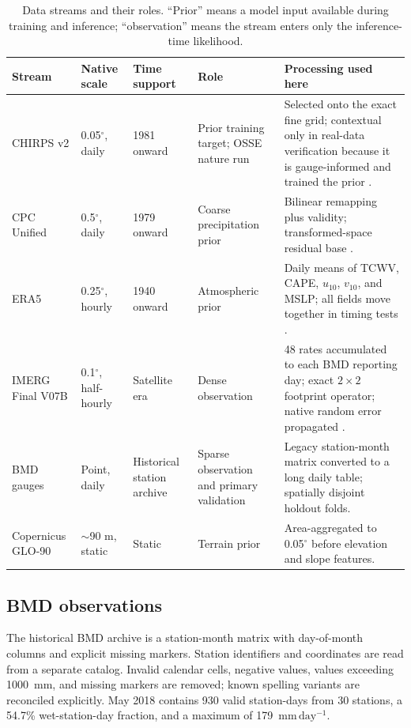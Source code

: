 \documentclass[10pt,twocolumn]{article}
\newcommand{\mmday}{\mathrm{mm\,day^{-1}}}
\begin{document}
\begin{table}[t]
\centering
\caption{Data streams and their roles. ``Prior'' means a model input available during training and inference; ``observation'' means the stream enters only the inference-time likelihood.}
\label{tab:data}
\small
\begin{tabular}{L{0.14\textwidth}L{0.11\textwidth}L{0.13\textwidth}L{0.14\textwidth}L{0.32\textwidth}}
\toprule
Stream & Native scale & Time support & Role & Processing used here \\
\midrule
CHIRPS v2 & 0.05$^\circ$, daily & 1981 onward & Prior training target; OSSE nature run & Selected onto the exact fine grid; contextual only in real-data verification because it is gauge-informed and trained the prior \cite{funk2015}. \\
CPC Unified & 0.5$^\circ$, daily & 1979 onward & Coarse precipitation prior & Bilinear remapping plus validity; transformed-space residual base \cite{chen2008}. \\
ERA5 & 0.25$^\circ$, hourly & 1940 onward & Atmospheric prior & Daily means of TCWV, CAPE, $u_{10}$, $v_{10}$, and MSLP; all fields move together in timing tests \cite{hersbach2020}. \\
IMERG Final V07B & 0.1$^\circ$, half-hourly & Satellite era & Dense observation & 48 rates accumulated to each BMD reporting day; exact $2\times2$ footprint operator; native random error propagated \cite{huffman2020}. \\
BMD gauges & Point, daily & Historical station archive & Sparse observation and primary validation & Legacy station-month matrix converted to a long daily table; spatially disjoint holdout folds. \\
Copernicus GLO-90 & $\sim$90 m, static & Static & Terrain prior & Area-aggregated to 0.05$^\circ$ before elevation and slope features. \\
\bottomrule
\end{tabular}
\end{table}

\subsection{BMD observations}

The historical BMD archive is a station-month matrix with day-of-month columns and explicit missing markers. Station identifiers and coordinates are read from a separate catalog. Invalid calendar cells, negative values, values exceeding 1000~mm, and missing markers are removed; known spelling variants are reconciled explicitly. May 2018 contains 930 valid station-days from 30 stations, a 54.7\% wet-station-day fraction, and a maximum of 179~$\mmday$.
\end{document}
